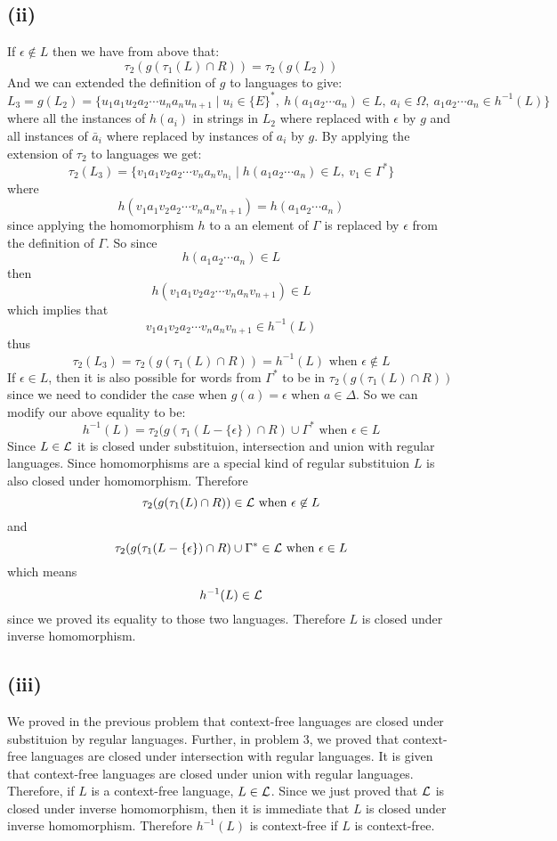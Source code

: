 \documentclass[12pt]{article}
\begin{document}
\subsection*{(ii)} If $\epsilon \not\in L$ then we have from above that:
$$\tau_2(g(\tau_1(L)\cap R)) = \tau_2(g(L_2))$$
And we can extended the definition of $g$ to languages to give:
$$L_3 = g(L_2) = \{u_1a_1u_2a_2\cdots u_na_nu_{n+1} \mid u_i \in \{E\}^*
,\ h(a_1a_2\cdots a_n) \in L,\ a_i\in \Omega
,\ a_1a_2\cdots a_n \in h^{-1}(L)\}$$
where all the instances of $h(a_i)$ in strings in $L_2$ where replaced with
$\epsilon$ by $g$ and all instances of $\bar a_i$ where replaced by
instances of $a_i$ by $g$. By applying the extension of $\tau_2$ to languages
we get:
$$\tau_2(L_3) = \{v_1a_1v_2a_2\cdots v_na_nv_{n_1}
\mid h(a_1a_2\cdots a_n) \in L,\ v_1\in \Gamma^*\}$$
where
$$h(v_1a_1v_2a_2\cdots v_na_nv_{n+1}) = h(a_1a_2\cdots a_n)$$
since applying the homomorphism $h$ to a an element of $\Gamma$ is replaced by
$\epsilon$ from the definition of $\Gamma$.
So since
$$h(a_1a_2\cdots a_n) \in L$$
then
$$h(v_1a_1v_2a_2\cdots v_na_nv_{n+1}) \in L$$
which implies that
$$v_1a_1v_2a_2\cdots v_na_nv_{n+1} \in h^{-1}(L)$$
thus
$$\tau_2(L_3) = \tau_2(g(\tau_1(L)\cap R)) = h^{-1}(L) \text{ when }
\epsilon \not\in L$$
If $\epsilon \in L$, then it is also possible for words from $\Gamma^*$ to be in
$\tau_2(g(\tau_1(L)\cap R))$ since we need to condider the case when
$g(a) = \epsilon$ when $a\in \Delta$. So we can modify our above equality to be:
$$h^{-1}(L) = \tau_2(g(\tau_1(L-\{\epsilon\}) \cap R) \cup \Gamma^*
\text{ when } \epsilon\in L$$
Since $L\in {\cal L}$ it is closed under substituion, intersection and union with
regular languages. Since homomorphisms are a special kind of regular substituion
$L$ is also closed under homomorphism. Therefore
$$\tau_2(g(\tau_1(L)\cap R)) \in {\cal L} \text{ when } \epsilon \not\in L$$
and
$$\tau_2(g(\tau_1(L-\{\epsilon\}) \cap R) \cup \Gamma^* \in {\cal L} \text{ when }
\epsilon\in L$$
which means
$$h^{-1}(L) \in {\cal L}$$
since we proved its equality to those two languages.
Therefore $L$ is closed under inverse homomorphism.

\subsection*{(iii)} We proved in the previous problem that context-free languages
are closed under substituion by regular languages. Further, in problem 3, we
proved that context-free languages are closed under intersection with regular
languages. It is given that context-free languages are closed under union
with regular languages. Therefore, if $L$ is a context-free language,
$L \in {\cal L}$. Since we just proved that ${\cal L}$ is closed under inverse
homomorphism, then it is immediate that $L$ is closed under inverse
homomorphism. Therefore $h^{-1}(L)$ is context-free if $L$ is context-free.
\end{document}
